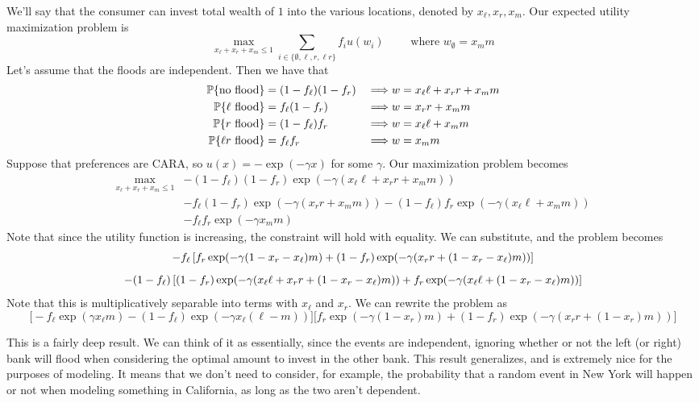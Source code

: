 \documentclass[12pt]{article}
\begin{document}
We'll say that the consumer can invest total wealth of $1$ into the various locations, denoted by $x_\ell, x_r, x_m$. Our expected utility maximization problem is
\[
\max_{x_\ell + x_r + x_m \le 1} \sum_{i \in \{\emptyset,\ell,r,\ell r\}} f_i u(w_i) \qquad \text{ where } w_{\emptyset} = x_mm
\]
Let's assume that the floods are independent. Then we have that
\begin{align*}
	\mathbb{P}\{\text{no flood}\} &= (1-f_\ell)(1-f_r) &&\Longrightarrow w = x_\ell \ell + x_r r + x_mm \\
	\mathbb{P}\{\ell\text{ flood}\} &= f_\ell(1-f_r) &&\Longrightarrow w =  x_r r + x_mm \\
	\mathbb{P}\{r\text{ flood}\} &= (1-f_\ell)f_r &&\Longrightarrow w = x_\ell \ell + x_mm \\
	\mathbb{P}\{\ell r\text{ flood}\} &= f_\ell f_r &&\Longrightarrow w =  x_mm
\end{align*}
Suppose that preferences are CARA, so $u(x) = -\exp(-\gamma x)$ for some $\gamma$. Our maximization problem becomes
\begin{align*}
	\max_{x_\ell + x_r + x_m \le 1}& -(1-f_\ell)(1-f_r)\exp(-\gamma (x_\ell \ell + x_r r + x_mm)) \\
	&-  f_\ell(1-f_r)\exp(-\gamma (x_r r + x_mm)) - (1-f_\ell)f_r \exp(-\gamma ( x_\ell \ell + x_mm )) \\
	&-  f_\ell f_r \exp(-\gamma x_mm) 
\end{align*}
Note that since the utility function is increasing, the constraint will hold with equality. We can substitute, and the problem becomes
\[
-f_\ell \left[ f_r \exp(-\gamma (1-x_r - x_\ell)m)  + (1-f_r)\exp(-\gamma (x_r r + (1-x_r - x_\ell)m))\right]
\]
\[
-(1-f_\ell) \left[ (1-f_r)\exp(-\gamma (x_\ell \ell + x_r r + (1-x_r - x_\ell)m)) + f_r \exp(-\gamma ( x_\ell \ell + (1-x_r - x_\ell)m ))\right]
\]
Note that this is multiplicatively separable into terms with $x_\ell$ and $x_r$. We can rewrite the problem as
\[
	\Big[-f_\ell \exp(\gamma x_\ell m)  -(1-f_\ell) \exp(-\gamma x_\ell (\ell - m))\Big]\Big[f_r \exp(-\gamma (1-x_r)m)  +(1-f_r)\exp(-\gamma (x_r r + (1-x_r)m)) \Big] 
\]

\begin{remark}
	This is a fairly deep result. We can think of it as essentially, since the events are independent, ignoring whether or not the left (or right) bank will flood when considering the optimal amount to invest in the other bank. This result generalizes, and is extremely nice for the purposes of modeling. It means that we don't need to consider, for example, the probability that a random event in New York will happen or not when modeling something in California, as long as the two aren't dependent.
\end{remark}
\end{document}
